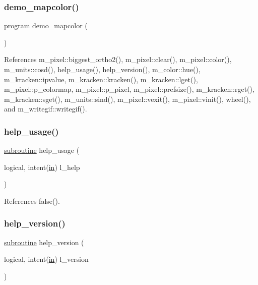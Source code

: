 \subsubsection{\texorpdfstring{demo\+\_\+mapcolor()}{demo\_mapcolor()}}
{\footnotesize\ttfamily program demo\+\_\+mapcolor (\begin{DoxyParamCaption}{ }\end{DoxyParamCaption})}



References m\+\_\+pixel\+::biggest\+\_\+ortho2(), m\+\_\+pixel\+::clear(), m\+\_\+pixel\+::color(), m\+\_\+units\+::cosd(), help\+\_\+usage(), help\+\_\+version(), m\+\_\+color\+::hue(), m\+\_\+kracken\+::ipvalue, m\+\_\+kracken\+::kracken(), m\+\_\+kracken\+::lget(), m\+\_\+pixel\+::p\+\_\+colormap, m\+\_\+pixel\+::p\+\_\+pixel, m\+\_\+pixel\+::prefsize(), m\+\_\+kracken\+::rget(), m\+\_\+kracken\+::sget(), m\+\_\+units\+::sind(), m\+\_\+pixel\+::vexit(), m\+\_\+pixel\+::vinit(), wheel(), and m\+\_\+writegif\+::writegif().

\mbox{\label{huegif_8f90_a3e09a3b52ee8fb04eeb93fe5761626a8}} 
\subsubsection{\texorpdfstring{help\+\_\+usage()}{help\_usage()}}
{\footnotesize\ttfamily \hyperlink{M__stopwatch_83_8txt_acfbcff50169d691ff02d4a123ed70482}{subroutine} help\+\_\+usage (\begin{DoxyParamCaption}\item[{logical, intent(\hyperlink{M__journal_83_8txt_afce72651d1eed785a2132bee863b2f38}{in})}]{l\+\_\+help }\end{DoxyParamCaption})}



References false().

\mbox{\label{huegif_8f90_a39c21619b08a3c22f19e2306efd7f766}} 
\subsubsection{\texorpdfstring{help\+\_\+version()}{help\_version()}}
{\footnotesize\ttfamily \hyperlink{M__stopwatch_83_8txt_acfbcff50169d691ff02d4a123ed70482}{subroutine} help\+\_\+version (\begin{DoxyParamCaption}\item[{logical, intent(\hyperlink{M__journal_83_8txt_afce72651d1eed785a2132bee863b2f38}{in})}]{l\+\_\+version }\end{DoxyParamCaption})}



